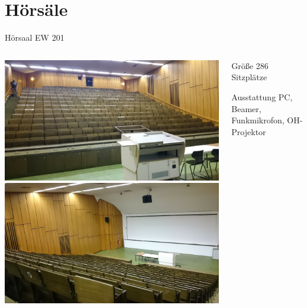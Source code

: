 \documentclass[compress,]{beamer}
\begin{document}
\section{Hörsäle}
\begin{frame}{Hörsaal EW 201}
  \begin{columns}[onlytextwidth]
    \begin{column}{0.5\textwidth}
      \includegraphics[width=\textwidth]{images/DSC_0712.JPG}\\
      \includegraphics[width=\textwidth]{images/DSC_0711.JPG}
    \end{column}
    \begin{column}{0.4\textwidth}
      \begin{block}{Größe}
        286 Sitzplätze
      \end{block}
      \vspace{1cm}
      \begin{block}{Ausstattung}
        PC, Beamer, Funkmikrofon, OH-Projektor
      \end{block}
    \end{column}
  \end{columns}
\end{frame}
\end{document}
